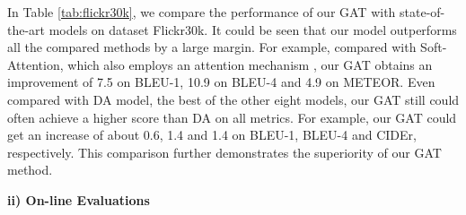 \documentclass[review]{elsarticle}
\begin{document}
In Table \ref{tab:flickr30k}, we compare the performance of our GAT with state-of-the-art models on dataset Flickr30k. It could be seen that our model outperforms all the compared methods by a large margin. For example, compared with Soft-Attention, which also employs an attention mechanism \cite{xu2015show}, our GAT obtains an improvement of 7.5 on BLEU-1, 10.9 on BLEU-4 and 4.9 on METEOR. Even compared with DA model\cite{gao2019deliberate}, the best of the other eight models, our GAT still could often achieve a higher score than DA on all metrics. For example, our GAT could get an increase of about 0.6, 1.4 and 1.4 on BLEU-1, BLEU-4 and CIDEr, respectively. This comparison further demonstrates the superiority of our GAT method.


\textbf{ii) On-line Evaluations}
\end{document}
